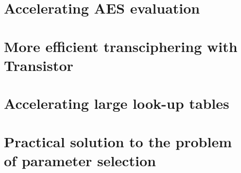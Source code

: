 \documentclass[11pt, twoside, openright]{thesis}
\begin{document}
\chapter{Accelerating AES evaluation}


\chapter{More efficient transciphering with Transistor}



\chapter{Accelerating large look-up tables}


\chapter{Practical solution to the problem of parameter selection}
%
%


%
%

\end{document}
